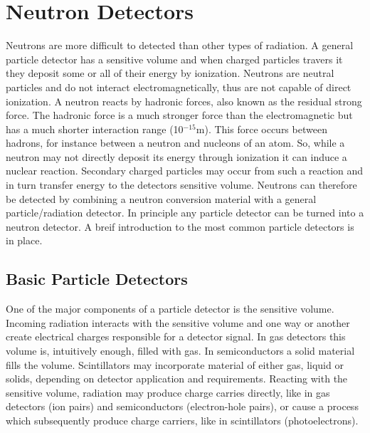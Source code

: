 \section{Neutron Detectors}
Neutrons are more difficult to detected than other types of radiation. A general particle detector has a sensitive volume and when charged particles travers it they deposit some or all of their energy by ionization. Neutrons are neutral particles and do not interact electromagnetically, thus are not capable of direct ionization. A neutron reacts by hadronic forces, also known as the residual strong force. The hadronic force is a much stronger force than the electromagnetic but has a much shorter interaction range (10$^{-15}$m).  This force occurs between hadrons, for instance between a neutron and nucleons of an atom. So, while a neutron may not directly deposit its energy through ionization it can induce a nuclear reaction.  Secondary charged particles may occur from such a reaction and in turn transfer energy to the detectors sensitive volume. Neutrons can therefore be detected by combining a neutron conversion material with a general particle/radiation detector.
In principle any particle detector can be turned into a neutron detector.
A breif introduction to the most common particle detectors is in place. %

\subsection{Basic Particle Detectors}
One of the major components of a particle detector is the sensitive volume. Incoming radiation interacts with the sensitive volume and one way or another create electrical charges responsible for a detector signal. In gas detectors this volume is, intuitively enough, filled with gas. In semiconductors a solid material fills the volume. Scintillators may incorporate material of either gas, liquid or solids, depending on detector application and requirements. Reacting with the sensitive volume, radiation may produce charge carries directly, like in gas detectors (ion pairs) and semiconductors (electron-hole pairs), or cause a process which subsequently produce charge carriers, like in scintillators (photoelectrons).

